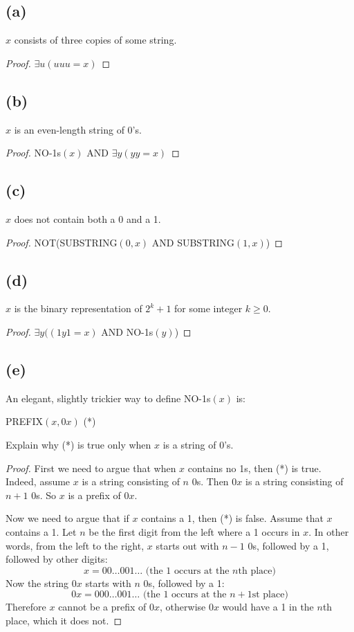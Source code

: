\documentclass[14pt]{extarticle}
\begin{document}
\subsection{(a)}
$x$ consists of three copies of some string.
\begin{proof}
$\exists u (uuu = x)$
\end{proof}

\subsection{(b)}
$x$ is an even-length string of 0’s.
\begin{proof}
NO-1s$(x)$ AND $\exists y (yy = x)$
\end{proof}

\subsection{(c)}
$x$ does not contain both a 0 and a 1.
\begin{proof}
NOT(SUBSTRING$(0,x)$ AND SUBSTRING$(1, x)$)
\end{proof}

\subsection{(d)}
$x$ is the binary representation of $2^k + 1$ for some integer $k \geq 0$.
\begin{proof}
$\exists y ((1y1 = x)$ AND NO-1s$(y)$)
\end{proof}

\subsection{(e)}
An elegant, slightly trickier way to define NO-1s$(x)$ is:

\begin{center}
PREFIX$(x, 0x)$ (*)
\end{center}

Explain why (*) is true only when $x$ is a string of 0’s.
\begin{proof}
First we need to argue that when $x$ contains no 1s, then (*) is true. Indeed, assume $x$ is a string consisting of $n$ 0s. Then $0x$ is a string consisting of $n+1$ 0s. So $x$ is a prefix of $0x$.

Now we need to argue that if $x$ contains a 1, then (*) is false. Assume that $x$ contains a 1. Let $n$ be the first digit from the left where a 1 occurs in $x$. In other words, from the left to the right, $x$ starts out with $n - 1$ 0s, followed by a 1, followed by other digits:
$$
x = 00 \ldots 001 \ldots \text{   (the 1 occurs at the $n$th place)}
$$
Now the string $0x$ starts with $n$ 0s, followed by a 1:
$$
0x = 000 \ldots 001 \ldots \text{   (the 1 occurs at the $n+1$st place)}
$$
Therefore $x$ cannot be a prefix of $0x$, otherwise $0x$ would have a 1 in the $n$th place, which it does not.
\end{proof}
\end{document}
